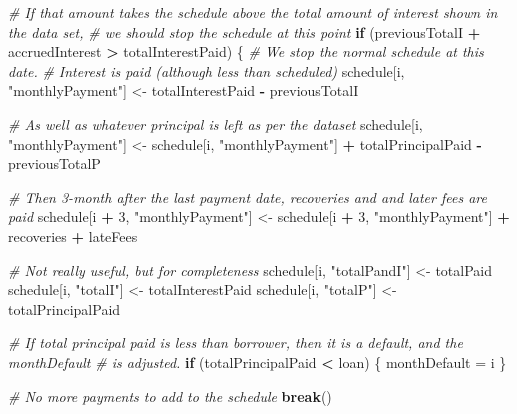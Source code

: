 \documentclass[11pt,]{report}
\newenvironment{Shaded}{\begin{snugshade}}{\end{snugshade}}
\newcommand{\CommentTok}[1]{\textcolor[rgb]{0.56,0.35,0.01}{\textit{#1}}}
\newcommand{\ControlFlowTok}[1]{\textcolor[rgb]{0.13,0.29,0.53}{\textbf{#1}}}
\newcommand{\DecValTok}[1]{\textcolor[rgb]{0.00,0.00,0.81}{#1}}
\newcommand{\NormalTok}[1]{#1}
\newcommand{\OperatorTok}[1]{\textcolor[rgb]{0.81,0.36,0.00}{\textbf{#1}}}
\newcommand{\StringTok}[1]{\textcolor[rgb]{0.31,0.60,0.02}{#1}}
\begin{document}
\begin{Shaded}
\begin{Highlighting}[numbers=left,,]
    \CommentTok{# If that amount takes the schedule above the total amount of interest shown in the data set,}
    \CommentTok{# we should stop the schedule at this point}
    \ControlFlowTok{if}\NormalTok{ (previousTotalI }\OperatorTok{+}\StringTok{ }\NormalTok{accruedInterest }\OperatorTok{>}\StringTok{ }\NormalTok{totalInterestPaid) \{}
      \CommentTok{# We stop the normal schedule at this date.}
      \CommentTok{# Interest is paid (although less than scheduled)}
\NormalTok{      schedule[i, }\StringTok{"monthlyPayment"}\NormalTok{] <-}
\StringTok{        }\NormalTok{totalInterestPaid }\OperatorTok{-}\StringTok{ }\NormalTok{previousTotalI}
      
      \CommentTok{# As well as whatever principal is left as per the dataset}
\NormalTok{      schedule[i, }\StringTok{"monthlyPayment"}\NormalTok{] <-}
\StringTok{        }\NormalTok{schedule[i, }\StringTok{"monthlyPayment"}\NormalTok{] }\OperatorTok{+}\StringTok{ }\NormalTok{totalPrincipalPaid }\OperatorTok{-}\StringTok{ }\NormalTok{previousTotalP}
      
      \CommentTok{# Then 3-month after the last payment date, recoveries and and later fees are paid}
\NormalTok{      schedule[i }\OperatorTok{+}\StringTok{ }\DecValTok{3}\NormalTok{, }\StringTok{"monthlyPayment"}\NormalTok{] <-}
\StringTok{        }\NormalTok{schedule[i }\OperatorTok{+}\StringTok{ }\DecValTok{3}\NormalTok{, }\StringTok{"monthlyPayment"}\NormalTok{] }\OperatorTok{+}\StringTok{ }\NormalTok{recoveries }\OperatorTok{+}\StringTok{ }\NormalTok{lateFees}
      
      \CommentTok{# Not really useful, but for completeness}
\NormalTok{      schedule[i, }\StringTok{"totalPandI"}\NormalTok{] <-}\StringTok{ }\NormalTok{totalPaid}
\NormalTok{      schedule[i, }\StringTok{"totalI"}\NormalTok{]     <-}\StringTok{ }\NormalTok{totalInterestPaid}
\NormalTok{      schedule[i, }\StringTok{"totalP"}\NormalTok{]     <-}\StringTok{ }\NormalTok{totalPrincipalPaid}
      
      \CommentTok{# If total principal paid is less than borrower, then it is a default, and the monthDefault}
      \CommentTok{# is adjusted.}
      \ControlFlowTok{if}\NormalTok{ (totalPrincipalPaid }\OperatorTok{<}\StringTok{ }\NormalTok{loan) \{}
\NormalTok{        monthDefault =}\StringTok{ }\NormalTok{i}
\NormalTok{      \}}
      
      \CommentTok{# No more payments to add to the schedule}
      \ControlFlowTok{break}\NormalTok{()}
      

\end{Highlighting}
\end{Shaded}
\end{document}
